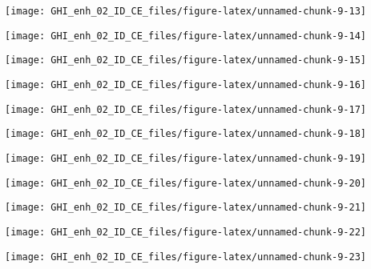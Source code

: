 \documentclass[
  10pt,
  a4paper,oneside]{article}
\begin{document}
\begin{center}\texttt{[image: GHI\_enh\_02\_ID\_CE\_files/figure-latex/unnamed-chunk-9-13]} \end{center}

\begin{center}\texttt{[image: GHI\_enh\_02\_ID\_CE\_files/figure-latex/unnamed-chunk-9-14]} \end{center}

\begin{center}\texttt{[image: GHI\_enh\_02\_ID\_CE\_files/figure-latex/unnamed-chunk-9-15]} \end{center}

\begin{center}\texttt{[image: GHI\_enh\_02\_ID\_CE\_files/figure-latex/unnamed-chunk-9-16]} \end{center}

\begin{center}\texttt{[image: GHI\_enh\_02\_ID\_CE\_files/figure-latex/unnamed-chunk-9-17]} \end{center}

\begin{center}\texttt{[image: GHI\_enh\_02\_ID\_CE\_files/figure-latex/unnamed-chunk-9-18]} \end{center}

\begin{center}\texttt{[image: GHI\_enh\_02\_ID\_CE\_files/figure-latex/unnamed-chunk-9-19]} \end{center}

\begin{center}\texttt{[image: GHI\_enh\_02\_ID\_CE\_files/figure-latex/unnamed-chunk-9-20]} \end{center}

\begin{center}\texttt{[image: GHI\_enh\_02\_ID\_CE\_files/figure-latex/unnamed-chunk-9-21]} \end{center}

\begin{center}\texttt{[image: GHI\_enh\_02\_ID\_CE\_files/figure-latex/unnamed-chunk-9-22]} \end{center}

\begin{center}\texttt{[image: GHI\_enh\_02\_ID\_CE\_files/figure-latex/unnamed-chunk-9-23]} \end{center}
\end{document}
